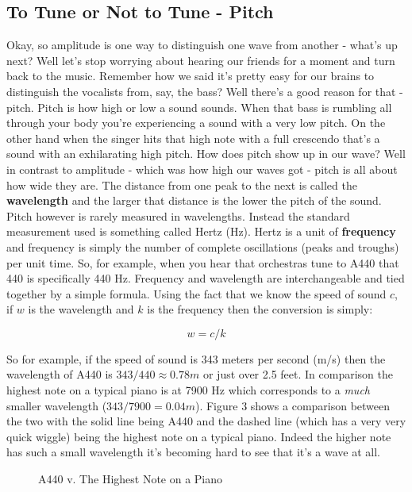 \documentclass[10pt,a4paper]{article}
\begin{document}
\subsection{To Tune or Not to Tune - Pitch}
Okay, so amplitude is one way to distinguish one wave from another - what's up next? Well let's stop worrying about hearing our friends for a moment and turn back to the music. Remember how we said it's pretty easy for our brains to distinguish the vocalists from, say, the bass? Well there's a good reason for that - pitch. Pitch is how high or low a sound sounds. When that bass is rumbling all through your body you're experiencing a sound with a very low pitch. On the other hand when the singer hits that high note with a full crescendo that's a sound with an exhilarating high pitch. How does pitch show up in our wave? Well in contrast to amplitude - which was how high our waves got - pitch is all about how wide they are. The distance from one peak to the next is called the \textbf{wavelength} and the larger that distance is the lower the pitch of the sound. Pitch however is rarely measured in wavelengths. Instead the standard measurement used is something called Hertz (Hz). Hertz is a unit of \textbf{frequency} and frequency is simply the number of complete oscillations (peaks and troughs) per unit time. So, for example, when you hear that orchestras tune to A440 that 440 is specifically 440 Hz. Frequency and wavelength are interchangeable and tied together by a simple formula. Using the fact that we know the speed of sound $c$, if $w$ is the wavelength and $k$ is the frequency then the conversion is simply:

\begin{equation}
w = c/k
\end{equation}

So for example, if the speed of sound is 343 meters per second (m/s) then the wavelength of A440 is $343/440\approx0.78m$ or just over 2.5 feet. In comparison the highest note on a typical piano is at 7900 Hz \cite{wikipiano} which corresponds to a \textit{much} smaller wavelength ($343/7900=0.04m$). Figure 3 shows a comparison between the two with the solid line being A440 and the dashed line (which has a very very quick wiggle) being the highest note on a typical piano. Indeed the higher note has such a small wavelength it's becoming hard to see that it's a wave at all.

\begin{figure}[!htb]
\caption{\label{fig:my-label} A440 v. The Highest Note on a Piano}
\end{figure}
\end{document}
